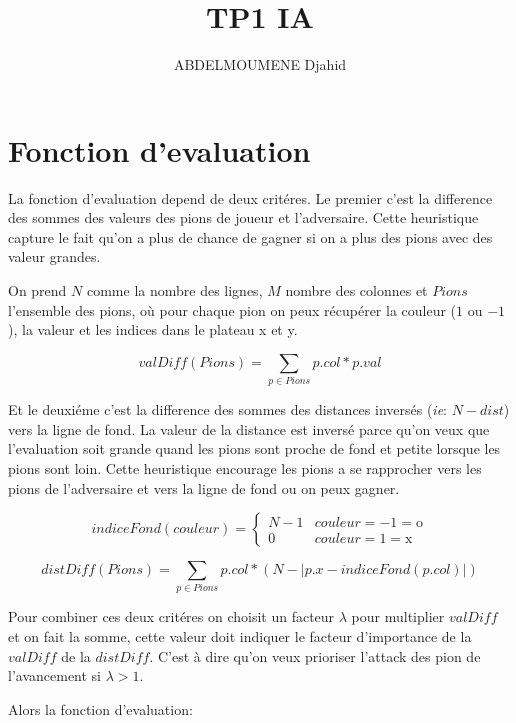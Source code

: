 \documentclass {article}
\title{TP1 IA}
\author{ABDELMOUMENE Djahid}
\begin{document}
\maketitle

\section{Fonction d'evaluation}
La fonction d'evaluation depend de deux critéres. Le premier c'est la
difference des sommes des valeurs des pions de joueur et l'adversaire.
Cette heuristique capture le fait qu'on a plus de chance de gagner si on
a plus des pions avec des valeur grandes.

On prend $N$ comme la nombre des lignes, $M$ nombre des colonnes et $Pions$
l'ensemble des pions, où pour chaque pion on peux récupérer la couleur ($1$ ou
$-1$), la valeur et les indices dans le plateau x et y.

\begin{equation*}
   valDiff(Pions) = \sum_{p \in Pions} p.col * p.val
\end{equation*}

Et le deuxiéme c'est la difference des sommes des distances inversés
(\textit{ie}: $N - dist$) vers la ligne de fond. La valeur de la distance est
inversé parce qu'on veux que l'evaluation soit grande quand les pions sont proche
de fond et petite lorsque les pions sont loin. Cette heuristique encourage les
pions a se rapprocher vers les pions de l'adversaire et vers la ligne de fond ou
on peux gagner.

\begin{equation*}
   indiceFond(couleur) =
   \begin{cases}
      N-1 & couleur = -1 = \text{o}\\
      0   & couleur = 1 = \text{x}
   \end{cases}
\end{equation*}

\begin{equation*}
   distDiff(Pions) = \sum_{p \in Pions} p.col * (N - \lvert p.x
   - indiceFond(p.col) \rvert)
\end{equation*}

Pour combiner ces deux critéres on choisit un facteur $\lambda$ pour multiplier
$valDiff$ et on fait la somme, cette valeur doit indiquer le facteur d'importance
de la $valDiff$ de la $distDiff$. C'est à dire qu'on veux prioriser l'attack
des pion de l'avancement si $\lambda > 1$.

Alors la fonction d'evaluation:
\end{document}
